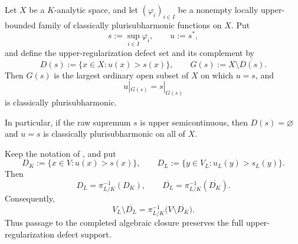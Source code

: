 
\begin{theorem}
\label{thm:p031-usc-defect-localization}
Let $X$ be a $K$-analytic space, and let $(\varphi_i)_{i\in I}$ be a
nonempty locally upper-bounded family of classically plurisubharmonic
functions on $X$.  Put
\[
                  s:=\sup_{i\in I}\varphi_i,\qquad u:=s^*,
\]
and define the upper-regularization defect set and its complement by
\[
 D(s):=\{x\in X:u(x)>s(x)\},
 \qquad
 G(s):=X\setminus\overline{D(s)}.
\]
Then $G(s)$ is the largest ordinary open subset of $X$ on which
$u=s$, and
\[
                         u|_{G(s)}=s|_{G(s)}
\]
is classically plurisubharmonic.

In particular, if the raw supremum $s$ is upper semicontinuous, then
$D(s)=\varnothing$ and $u=s$ is classically plurisubharmonic on all of
$X$.
\end{theorem}

\begin{corollary}
\label{cor:p031-completed-algebraic-closure-defect-support}
Keep the notation of
, and put
\[
 D_K:=\{x\in V:u(x)>s(x)\},
 \qquad
 D_L:=\{y\in V_L:u_L(y)>s_L(y)\}.
\]
Then
\[
 D_L=\pi_{L/K}^{-1}(D_K),
 \qquad
\overline{D_L}=\pi_{L/K}^{-1}(\overline{D_K}).
\]
Consequently,
\[
 V_L\setminus\overline{D_L}
   =\pi_{L/K}^{-1}\bigl(V\setminus\overline{D_K}\bigr).
\]
Thus passage to the completed algebraic closure preserves the full
upper-regularization defect support.
\end{corollary}
